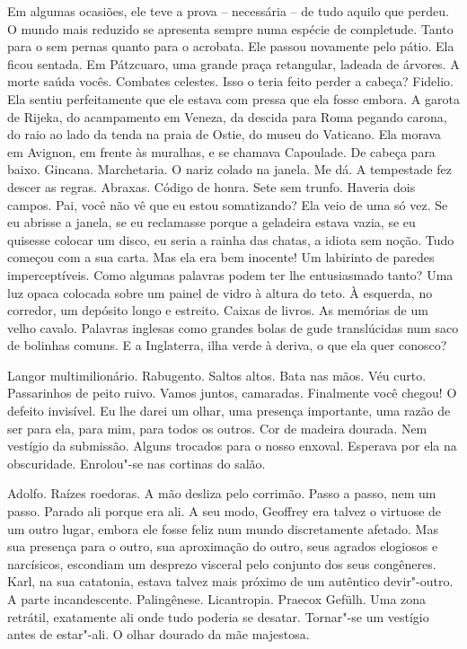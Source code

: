 Em algumas ocasiões, ele teve a prova -- necessária -- de tudo aquilo
que perdeu. O mundo mais reduzido se apresenta sempre numa espécie de
completude. Tanto para o sem pernas quanto para o acrobata. Ele passou
novamente pelo pátio. Ela ficou sentada. Em Pátzcuaro, uma grande praça
retangular, ladeada de árvores. A morte saúda vocês. Combates celestes.
Isso o teria feito perder a cabeça? Fidelio. Ela sentiu perfeitamente
que ele estava com pressa que ela fosse embora. A garota de Rijeka, do
acampamento em Veneza, da descida para Roma pegando carona, do raio ao
lado da tenda na praia de Ostie, do museu do Vaticano. Ela morava em
Avignon, em frente às muralhas, e se chamava Capoulade. De cabeça para
baixo. Gincana. Marchetaria. O nariz colado na janela. Me dá. A
tempestade fez descer as regras. Abraxas. Código de honra. Sete sem
trunfo. Haveria dois campos. Pai, você não vê que eu estou somatizando?
Ela veio de uma só vez. Se eu abrisse a janela, se eu reclamasse porque
a geladeira estava vazia, se eu quisesse colocar um disco, eu seria a
rainha das chatas, a idiota sem noção. Tudo começou com a sua carta. Mas
ela era bem inocente! Um labirinto de paredes imperceptíveis. Como
algumas palavras podem ter lhe entusiasmado tanto? Uma luz opaca
colocada sobre um painel de vidro à altura do teto. À esquerda, no
corredor, um depósito longo e estreito. Caixas de livros. As memórias de
um velho cavalo. Palavras inglesas como grandes bolas de gude
translúcidas num saco de bolinhas comuns. E a Inglaterra, ilha verde à
deriva, o que ela quer conosco?

Langor multimilionário. Rabugento. Saltos altos. Bata nas mãos. Véu
curto. Passarinhos de peito ruivo. Vamos juntos, camaradas. Finalmente
você chegou! O defeito invisível. Eu lhe darei um olhar, uma presença
importante, uma razão de ser para ela, para mim, para todos os outros.
Cor de madeira dourada. Nem vestígio da submissão. Alguns trocados para
o nosso enxoval. Esperava por ela na obscuridade. Enrolou"-se nas
cortinas do salão.

Adolfo. Raízes roedoras. A mão desliza pelo corrimão. Passo a passo, nem
um passo. Parado ali porque era ali. A seu modo, Geoffrey era talvez o
virtuose de um outro lugar, embora ele fosse feliz num mundo
discretamente afetado. Mas sua presença para o outro, sua aproximação do
outro, seus agrados elogiosos e narcísicos, escondiam um desprezo
visceral pelo conjunto dos seus congêneres. Karl, na sua catatonia,
estava talvez mais próximo de um autêntico devir"-outro. A parte
incandescente. Palingênese. Licantropia. Praecox Gefülh. Uma zona
retrátil, exatamente ali onde tudo poderia se desatar. Tornar"-se um
vestígio antes de estar"-ali. O olhar dourado da mãe majestosa.

